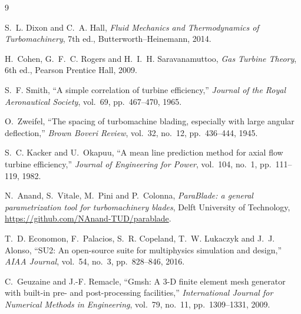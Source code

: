 \begin{thebibliography}{9}

S.~L. Dixon and C.~A. Hall,
\emph{Fluid Mechanics and Thermodynamics of Turbomachinery},
7th ed., Butterworth--Heinemann, 2014.

H.~Cohen, G.~F.~C. Rogers and H.~I.~H. Saravanamuttoo,
\emph{Gas Turbine Theory}, 6th ed., Pearson Prentice Hall, 2009.

S.~F. Smith,
``A simple correlation of turbine efficiency,''
\emph{Journal of the Royal Aeronautical Society}, vol.~69, pp.~467--470, 1965.

O.~Zweifel,
``The spacing of turbomachine blading, especially with large angular deflection,''
\emph{Brown Boveri Review}, vol.~32, no.~12, pp.~436--444, 1945.

S.~C. Kacker and U.~Okapuu,
``A mean line prediction method for axial flow turbine efficiency,''
\emph{Journal of Engineering for Power}, vol.~104, no.~1, pp.~111--119, 1982.

N.~Anand, S.~Vitale, M.~Pini and P.~Colonna,
\emph{ParaBlade: a general parametrization tool for turbomachinery blades},
Delft University of Technology, \url{https://github.com/NAnand-TUD/parablade}.

T.~D. Economon, F.~Palacios, S.~R. Copeland, T.~W. Lukaczyk and J.~J. Alonso,
``SU2: An open-source suite for multiphysics simulation and design,''
\emph{AIAA Journal}, vol.~54, no.~3, pp.~828--846, 2016.

C.~Geuzaine and J.-F. Remacle,
``Gmsh: A 3-D finite element mesh generator with built-in pre- and
post-processing facilities,''
\emph{International Journal for Numerical Methods in Engineering},
vol.~79, no.~11, pp.~1309--1331, 2009.

\end{thebibliography}
